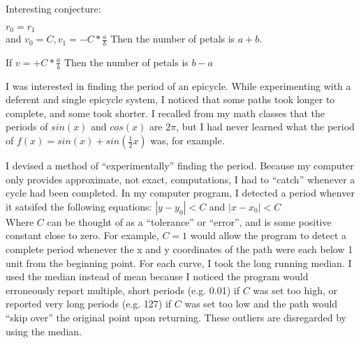 Interesting conjecture:

$r_0 = r_1$ \\
and
$v_0 = C, v_1 = -C*\frac{a}{b}$
Then the number of petals is $a + b$. 

If $v= +C*\frac{a}{b}$
Then the number of petals is $b - a$


I was interested in finding the period of an epicycle. While experimenting with a deferent and single epicycle system, I noticed that some paths took longer to complete, and some took shorter. I recalled from my math classes that the periods of $sin(x)$ and $cos(x)$ are $2\pi$, but I had never learned what the period of $f(x) = sin(x) + sin(\frac{1}{2}x)$ was, for example. 

I devised a method of ``experimentally'' finding the period. Because my computer only provides approximate, not exact, computations, I had to ``catch'' whenever a cycle had been completed. In my computer program, I detected a period whenver it satsifed the following equations:
$|y - y_{0}| < C$  and  $|x - x_{0}| < C$ \\

Where $C$ can be thought of as a ``tolerance'' or ``error'', and is some positive constant close to zero. For example, $C=1$ would allow the program to detect a complete period whenever the x and y coordinates of the path were each below 1 unit from the beginning point. For each curve, I took the long running median. I used the median instead of mean because I noticed the program would erroneously report multiple, short periods (e.g. 0.01) if $C$ was set too high, or reported very long periods (e.g. 127) if $C$ was set too low and the path would ``skip over'' the original point upon returning. These outliers are disregarded by using the median.

